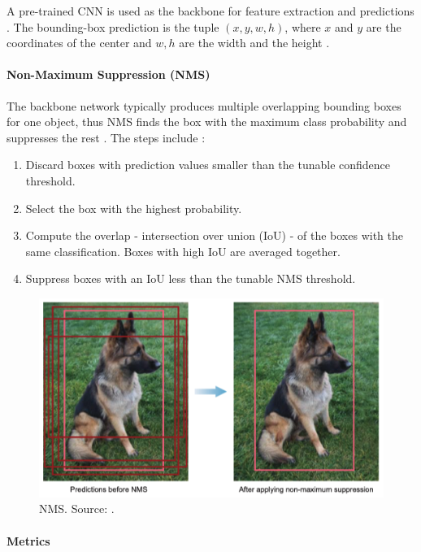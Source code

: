 \documentclass[a4paper, 11pt, oneside]{article}
\begin{document}
A pre-trained CNN is used as the backbone for feature extraction and predictions \cite{elgendy2020deep}. The bounding-box
prediction is the tuple $(x, y, w, h)$, where $x$ and $y$ are the coordinates of the center and $w, h$ are the width and
the height \cite{elgendy2020deep}.

\paragraph{Non-Maximum Suppression (NMS)}

The backbone network typically produces multiple overlapping bounding boxes for one object, thus NMS finds
the box with the maximum class probability and suppresses the rest \cite{elgendy2020deep}. The steps include
\cite{elgendy2020deep}:

\begin{enumerate}
  \item Discard boxes with prediction values smaller than the tunable confidence threshold.
  \item Select the box with the highest probability.
  \item Compute the overlap - intersection over union (IoU) - of the boxes with the same classification. Boxes with high
  IoU are averaged together.
  \item Suppress boxes with an IoU less than the tunable NMS threshold.
\end{enumerate}

\begin{figure}[ht]
  \begin{center}
    \includegraphics[width=.8\textwidth]{nms.png}
  \end{center}
  \caption{NMS. Source: \cite{elgendy2020deep}.}
\end{figure}

\paragraph{Metrics}
\end{document}
